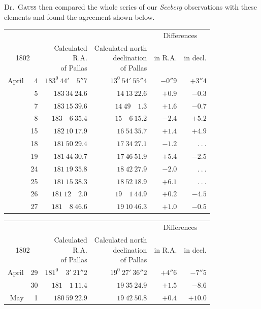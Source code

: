 Dr.\ \textsc{Gauss} then compared the whole series of our \textit{Seeberg} observations with these elements and found the agreement shown below.
\begin{center}
{\small\setlength{\tabcolsep}{5pt}
\begin{tabular}{r r|r|r|r|r}
\multicolumn{2}{c|}{}&&&\multicolumn{2}{c}{Differences}\\
\multicolumn{2}{c|}{1802}&\shortstack{Calculated\\R.A.\\of Pallas}&\shortstack{Calculated north\\declination\\of Pallas}&in R.A.&in decl.\\\hline
April&4&$183^0\ 44'\quad5''7$&$13^0\ 54'\ 55''4$&$-0''9$&$+3''4$\\
&5&$183\ 34\ 24.6$&$14\ 13\ 22.6$&$+0.9$&$-0.3$\\
&7&$183\ 15\ 39.6$&$14\ 49\quad1.3$&$+1.6$&$-0.7$\\
&8&$183\quad6\ 35.4$&$15\quad6\ 15.2$&$-2.4$&$+5.2$\\
&15&$182\ 10\ 17.9$&$16\ 54\ 35.7$&$+1.4$&$+4.9$\\
&18&$181\ 50\ 29.4$&$17\ 34\ 27.1$&$-1.2$&$\ .\ .\ .$\\
&19&$181\ 44\ 30.7$&$17\ 46\ 51.9$&$+5.4$&$-2.5$\\
&24&$181\ 19\ 35.8$&$18\ 42\ 27.9$&$-2.0$&$\ .\ .\ .$\\
&25&$181\ 15\ 38.3$&$18\ 52\ 18.9$&$+6.1$&$\ .\ .\ .$\\
&26&$181\ 12\quad2.0$&$19\quad1\ 44.9$&$+0.2$&$-4.5$\\
&27&$181\quad8\ 46.6$&$19\ 10\ 46.3$&$+1.0$&$-0.5$
\end{tabular}
\par\medskip
\begin{tabular}{r r|r|r|r|r}
\multicolumn{2}{c|}{}&&&\multicolumn{2}{c}{Differences}\\
\multicolumn{2}{c|}{1802}&\shortstack{Calculated\\R.A.\\of Pallas}&\shortstack{Calculated north\\declination\\of Pallas}&in R.A.&in decl.\\\hline
April&29&$181^0\quad3'\ 21''2$&$19^0\ 27'\ 36''2$&$+4''6$&$-7''5$\\
&30&$181\quad1\ 11.4$&$19\ 35\ 24.9$&$+1.5$&$-8.6$\\
May&1&$180\ 59\ 22.9$&$19\ 42\ 50.8$&$+0.4$&$+10.0$\\

\end{tabular}}
\end{center}
